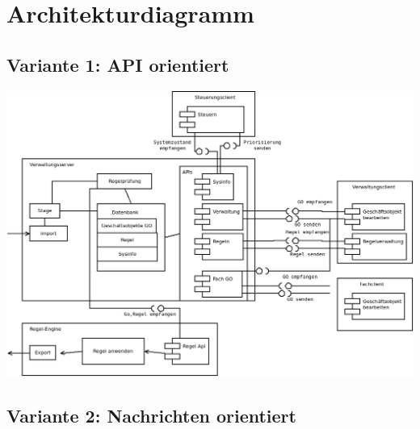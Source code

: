 \chapter{Architekturdiagramm}

\section{Variante 1: API orientiert}

\includegraphics[width=\textwidth]{EISWS1516Howe_MS2_Architektur_api.png}

\pa

\section{Variante 2: Nachrichten orientiert}



